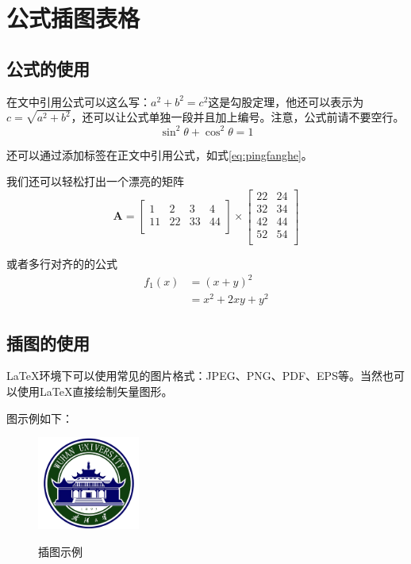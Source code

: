 
\chapter{公式插图表格}

\section{公式的使用}
在文中引用公式可以这么写：$a^2+b^2=c^2$这是勾股定理，他还可以表示为$c=\sqrt{a^2+b^2}$，还可以让公式单独一段并且加上编号。注意，公式前请不要空行。
\begin{equation}
\sin^2{\theta}+\cos^2{\theta}=1 \label{eq:pingfanghe}
\end{equation}

还可以通过添加标签在正文中引用公式，如式\eqref{eq:pingfanghe}。

我们还可以轻松打出一个漂亮的矩阵
\begin{equation}
  \mathbf{A}=
  \left[\begin{matrix}
    1&2&3&4\\
    11&22&33&44\\
  \end{matrix}\right] \times
  \left[\begin{matrix}
    22&24\\
    32&34\\
    42&44\\
    52&54\\
  \end{matrix}\right]
\end{equation}

或者多行对齐的的公式
\begin{equation}
  \begin{aligned}
    f_1(x)&=(x+y)^2\\
          &=x^2+2xy+y^2
  \end{aligned}
\end{equation}


\section{插图的使用}

\LaTeX 环境下可以使用常见的图片格式：JPEG、PNG、PDF、EPS等。当然也可以使用\LaTeX 直接绘制矢量图形。

图示例如下：

\begin{figure}[!htb]
  \centering
  \includegraphics[width=0.3\textwidth]
  {figures/whulogo.png}\\
  \caption{插图示例}
  \label{fig:whu}
\end{figure}

